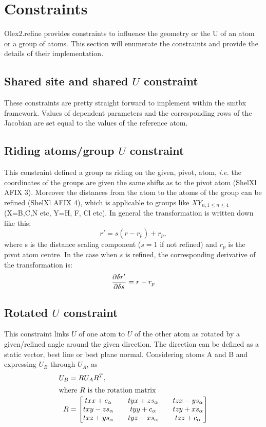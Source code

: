 \documentclass[pdf]{iucr}
\begin{document}
\section{Constraints}
Olex2.refine provides constraints to influence the geometry or the U of an atom or a group of atoms. This section will enumerate the constraints and provide the details of their implementation.

\subsection{Shared site and shared $U$ constraint}
These constraints are pretty straight forward to implement within the smtbx framework. Values of dependent parameters and the corresponding rows of the Jacobian are set equal to the values of the reference atom.

\subsection{Riding atoms/group $U$ constraint}
This constraint defined a group as riding on the given, pivot, atom, \emph{i.e.} the coordinates of the groups are given the same shifts as to the pivot atom (ShelXl AFIX 3). Moreover the distances from the atom to the atoms of the group can be refined (ShelXl AFIX 4), which is applicable to groups like $XY_{n, 1\leq n \leq 4}$ (X=B,C,N etc, Y=H, F, Cl etc). In general the transformation is written down like this:
\begin{equation}
r' = s(r-r_{p}) + r_{p},
\end{equation}
where s is the distance scaling component ($s=1$ if not refined) and $r_{p}$ is the pivot atom centre. In the case when $s$ is refined, the corresponding derivative of the transformation is:
\begin{equation}
\frac{\partial \delta r'}{\partial \delta s} = r-r_{p}
\end{equation}


\subsection{Rotated $U$ constraint}
This constraint links $U$ of one atom to $U$ of the other atom as  rotated by a given/refined angle around the given direction. The direction can be defined as a static vector, best line or best plane normal. Considering atoms A and B and expressing $U_{B}$ through $U_{A}$, as
\begin{align}
U_{B} &= RU_{A}R^{T}, \\
\intertext{where $R$ is the rotation matrix}
R &=
  \begin{bmatrix} \label{eq:rm}
    txx + c_\alpha && tyx + zs_\alpha && tzx - ys_\alpha \\
    txy - zs_\alpha && tyy + c_\alpha && tzy + xs_\alpha \\
    txz + ys_\alpha && tyz - xs_\alpha && tzz + c_\alpha \\
  \end{bmatrix}
\end{align}
\end{document}
